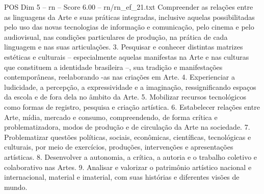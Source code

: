 \begin{textsample}{POS Dim 5 – rn – Score 6.00 – rn/rn\_ef\_21.txt}
Compreender as relações entre as linguagens da Arte e suas práticas integradas, inclusive aquelas possibilitadas pelo uso das novas tecnologias de informação e comunicação, pelo cinema e pelo audiovisual, nas condições particulares de produção, na prática de cada linguagem e nas suas articulações. 3.
Pesquisar e conhecer distintas matrizes estéticas e culturais – especialmente aquelas manifestas na Arte e nas culturas que constituem a identidade brasileira –, sua tradição e manifestações contemporâneas, reelaborando -as nas criações em Arte. 4.
Experienciar a ludicidade, a percepção, a expressividade e a imaginação, ressignificando espaços da escola e de fora dela no âmbito da Arte. 5.
Mobilizar recursos tecnológicos como formas de registro, pesquisa e criação artística. 6.
Estabelecer relações entre Arte, mídia, mercado e consumo, compreendendo, de forma crítica e problematizadora, modos de produção e de circulação da Arte na sociedade. 7.
Problematizar questões políticas, sociais, econômicas, científicas, tecnológicas e culturais, por meio de exercícios, produções, intervenções e apresentações artísticas. 8.
Desenvolver a autonomia, a crítica, a autoria e o trabalho coletivo e colaborativo nas Artes. 9.
Analisar e valorizar o patrimônio artístico nacional e internacional, material e imaterial, com suas histórias e diferentes visões de mundo.

\end{textsample}
